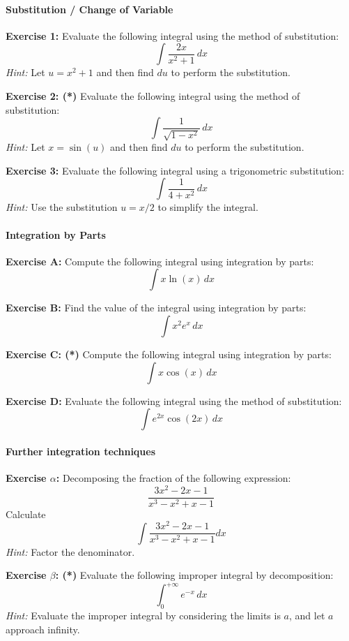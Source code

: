 \documentclass[]{article}
\begin{document}
	\paragraph{Substitution / Change of Variable}\mbox{}
	
	
	\textbf{Exercise 1:}
	Evaluate the following integral using the method of substitution:
	\[
	\int \frac{2x}{x^2 + 1} \, dx
	\]
	\textit{Hint:} Let \( u = x^2 + 1 \) and then find \( du \) to perform the substitution.
	
	\textbf{Exercise 2: (*)}
	Evaluate the following integral using the method of substitution:
	\[
	\int \frac{1}{\sqrt{1 - x^2}} \, dx
	\]
	\textit{Hint:} Let \( x = \sin(u) \) and then find \( du \) to perform the substitution.
	
	\textbf{Exercise 3:}
	Evaluate the following integral using a trigonometric substitution:
	\[
	\int \frac{1}{4 + x^2} \, dx
	\]
	\textit{Hint:} Use the substitution \(u = x/2\) to simplify the integral.
	
	
	\paragraph{Integration by Parts}\mbox{}
	
	\textbf{Exercise A:}
	Compute the following integral using integration by parts:
	\[
	\int x \ln(x) \, dx
	\]
	
	\textbf{Exercise B:}
	Find the value of the integral using integration by parts:
	\[
	\int x^2 e^x \, dx
	\]
	
	\textbf{Exercise C: (*)}
	Compute the following integral using integration by parts:
	\[
	\int x \cos(x) \, dx
	\]
	
	\textbf{Exercise D:}
	Evaluate the following integral using the method of substitution:
	\[
	\int e^{2x} \cos(2x) \, dx
	\]
	
	
	\paragraph{Further integration techniques}\mbox{}
	
	\textbf{Exercise $\alpha$:}
	Decomposing the fraction of the following expression:
	\[
	\frac{3x^2 - 2x - 1}{x^3 - x^2 + x - 1}
	\]
	Calculate
	\[
	\int \frac{3x^2 - 2x - 1}{x^3 - x^2 + x - 1} dx
	\]
	\textit{Hint:} Factor the denominator.
	
	\textbf{Exercise $\beta$: (*)}
	Evaluate the following improper integral by decomposition:
	\[
	\int_0^{+\infty} e^{-x}\, dx
	\]
	\textit{Hint:} Evaluate the improper integral by considering the limits is $a$, and let $a$ approach infinity.
	
\end{document}
